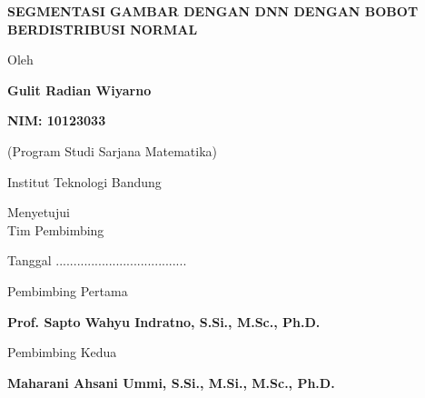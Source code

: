 \documentclass[12pt,a4paper,oneside]{book}
\begin{document}
\newpage
\thispagestyle{plain}
\begin{center}
    \vspace*{0.5cm}
    {\fontsize{14}{17}\bfseries SEGMENTASI GAMBAR DENGAN DNN DENGAN BOBOT BERDISTRIBUSI NORMAL\par}
    
    \vspace{2.5cm}
    {\fontsize{12}{15} Oleh\par}
    \vspace{0.3cm}
    {\fontsize{12}{15}\bfseries Gulit Radian Wiyarno\par}
    \vspace{0.2cm}
    {\fontsize{12}{15}\bfseries NIM: 10123033\par}
    \vspace{0.2cm}
    {\fontsize{12}{15}(Program Studi Sarjana Matematika)\par}
    
    \vspace{0.8cm}
    {\fontsize{12}{15} Institut Teknologi Bandung\par}
    
    \vspace{1.5cm}
    {\fontsize{12}{15} Menyetujui\\
    Tim Pembimbing\par}
    
    \vspace{0.4cm}
    {\fontsize{12}{15} Tanggal .....................................\par}
    
    \vspace{1.5cm}
    \noindent
    \begin{minipage}[t]{0.48\textwidth}
        \centering
        {\fontsize{12}{15} Pembimbing Pertama\par}
        \vspace{2.0cm}
        \underline{\hspace{5.5cm}}\par
        \vspace{0.2cm}
        {\fontsize{11}{14}\bfseries Prof. Sapto Wahyu Indratno, S.Si., M.Sc., Ph.D.\par}
    \end{minipage}%
    \hfill
    \begin{minipage}[t]{0.48\textwidth}
        \centering
        {\fontsize{12}{15} Pembimbing Kedua\par}
        \vspace{2.0cm}
        \underline{\hspace{5.5cm}}\par
        \vspace{0.2cm}
        {\fontsize{11}{14}\bfseries Maharani Ahsani Ummi, S.Si., M.Si., M.Sc., Ph.D.\par}
    \end{minipage}\par
\end{center}
\end{document}
